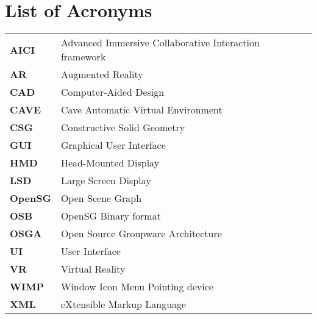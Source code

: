 \chapter*{List of Acronyms}

\begin{tabular}{ll}

\textbf{AICI} & Advanced Immersive Collaborative Interaction framework \\

\textbf{AR} & Augmented Reality \\

\textbf{CAD} & Computer-Aided Design \\

\textbf{CAVE} & Cave Automatic Virtual Environment \\

\textbf{CSG} & Constructive Solid Geometry \\

\textbf{GUI} & Graphical User Interface \\

\textbf{HMD} & Head-Mounted Display \\ 

\textbf{LSD} & Large Screen Display \\ 

\textbf{OpenSG} & Open Scene Graph \\

\textbf{OSB} & OpenSG Binary format \\

\textbf{OSGA} & Open Source Groupware Architecture \\

\textbf{UI} & User Interface \\

\textbf{VR} & Virtual Reality \\

\textbf{WIMP} & Window Icon Menu Pointing device \\

\textbf{XML} & eXtensible Markup Language \\

\end{tabular}
